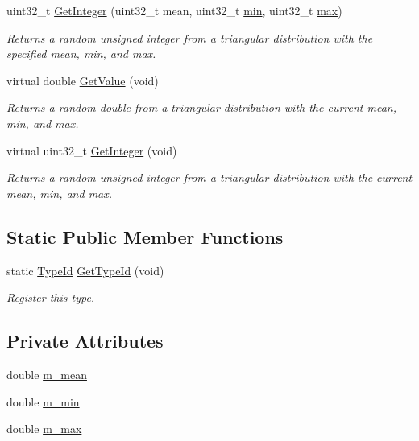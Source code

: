 \begin{DoxyCompactItemize}
uint32\+\_\+t \hyperlink{classns3_1_1TriangularRandomVariable_a3a81244c135cfce4a49e9d6531b0776e}{Get\+Integer} (uint32\+\_\+t mean, uint32\+\_\+t \hyperlink{80211b_8c_ac6afabdc09a49a433ee19d8a9486056d}{min}, uint32\+\_\+t \hyperlink{80211b_8c_affe776513b24d84b39af8ab0930fef7f}{max})
\begin{DoxyCompactList}\small\item\em Returns a random unsigned integer from a triangular distribution with the specified mean, min, and max. \end{DoxyCompactList}\item 
virtual double \hyperlink{classns3_1_1TriangularRandomVariable_a2d61dfce4b5be840c57aa1aea655e3c1}{Get\+Value} (void)
\begin{DoxyCompactList}\small\item\em Returns a random double from a triangular distribution with the current mean, min, and max. \end{DoxyCompactList}\item 
virtual uint32\+\_\+t \hyperlink{classns3_1_1TriangularRandomVariable_a7fae1b83f504385c69fd8102ef303d74}{Get\+Integer} (void)
\begin{DoxyCompactList}\small\item\em Returns a random unsigned integer from a triangular distribution with the current mean, min, and max. \end{DoxyCompactList}\end{DoxyCompactItemize}
\subsection*{Static Public Member Functions}
\begin{DoxyCompactItemize}
\item 
static \hyperlink{classns3_1_1TypeId}{Type\+Id} \hyperlink{classns3_1_1TriangularRandomVariable_aaa879aaf59bd170c0c3aa1947d1d6a66}{Get\+Type\+Id} (void)
\begin{DoxyCompactList}\small\item\em Register this type. \end{DoxyCompactList}\end{DoxyCompactItemize}
\subsection*{Private Attributes}
\begin{DoxyCompactItemize}
\item 
double \hyperlink{classns3_1_1TriangularRandomVariable_a9c1b9e0f4bf53d8277fdb76275df731a}{m\+\_\+mean}
\item 
double \hyperlink{classns3_1_1TriangularRandomVariable_acd78d6af1b19000d64c22fd2aba49493}{m\+\_\+min}
\item 
double \hyperlink{classns3_1_1TriangularRandomVariable_aa1a7f68942d3aefa85414784e0071244}{m\+\_\+max}
\end{DoxyCompactItemize}
